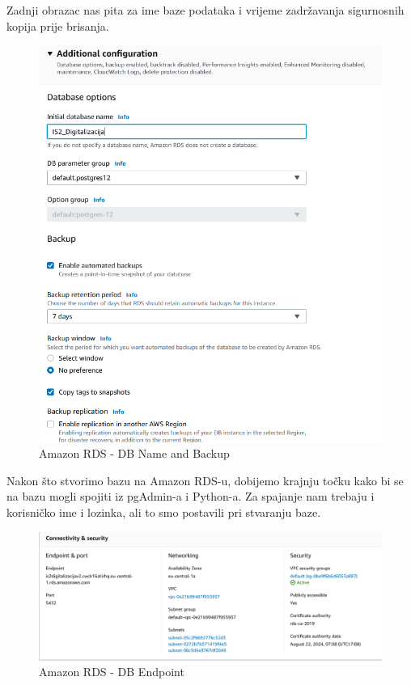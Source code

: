 Zadnji obrazac nas pita za ime baze podataka i vrijeme zadržavanja sigurnosnih kopija prije brisanja.

	 \begin{figure}[H]
	\centering
	\includegraphics[scale=0.55]{./slike/rds5.png}
	\caption{Amazon RDS - DB Name and Backup}
	\label{fig:rds5}
\end{figure}\eject

Nakon što stvorimo bazu na Amazon RDS-u, dobijemo krajnju točku kako bi se na bazu mogli spojiti iz pgAdmin-a i Python-a. Za spajanje nam trebaju i\\ korisničko ime i lozinka, ali to smo postavili pri stvaranju baze.
	 \begin{figure}[H]
	\centering
	\includegraphics[scale=0.55]{./slike/rds6.png}
	\caption{Amazon RDS - DB Endpoint}
	\label{fig:rds6}
\end{figure}





 
	 	 	 
		 	 
			\eject 
			